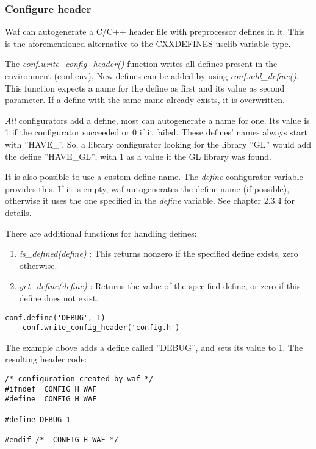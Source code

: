 \documentclass[a4,10pt]{article}
\begin{document}
\subsubsection{Configure header}
Waf can autogenerate a C/C++ header file with preprocessor defines in it. This is the aforementioned alternative to the CXXDEFINES uselib variable type.

The \emph{conf.write\_config\_header()} function writes all defines present in the environment (conf.env). New defines can be added by using \emph{conf.add\_define()}. This function expects a name for the define as first and its value as second parameter. If a define with the same name already exists, it is overwritten.

\emph{All} configurators add a define, most can autogenerate a name for one. Its value is 1 if the configurator succeeded or 0 if it failed. These defines' names always start with ''HAVE\_''. So, a library configurator looking for the library ''GL'' would add the define ''HAVE\_GL'', with 1 as a value if the GL library was found.

It is also possible to use a custom define name. The \emph{define} configurator variable provides this. If it is empty, waf autogenerates the define name (if possible), otherwise it uses the one specified in the \emph{define} variable. See chapter 2.3.4 for details.

There are additional functions for handling defines:

\begin{enumerate}
	\item \emph{is\_defined(define)} : This returns nonzero if the specified define exists, zero otherwise.
	\item \emph{get\_define(define)} : Returns the value of the specified define, or zero if this define does not exist.
\end{enumerate}

\begin{center}
	\begin{lstlisting}[caption=\footnotesize Configure header example]
    conf.define('DEBUG', 1)
    conf.write_config_header('config.h')
	\end{lstlisting}
\end{center}

The example above adds a define called ''DEBUG'', and sets its value to 1. The resulting header code:

\begin{center}
	\begin{lstlisting}[caption=\footnotesize Configure header example]
/* configuration created by waf */
#ifndef _CONFIG_H_WAF
#define _CONFIG_H_WAF

#define DEBUG 1

#endif /* _CONFIG_H_WAF */
	\end{lstlisting}
\end{center}
\end{document}
